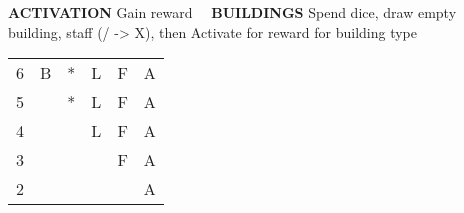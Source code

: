 \begin{flushleft}
\textbf{ACTIVATION} \textcolor{supplemental}{Gain reward} \ \ \textbf{BUILDINGS} \textcolor{supplemental}{Spend dice, draw empty building, staff (/ -> X), then Activate for reward}
\newline \textcolor{supplemental}{for building type}
\end{flushleft}
\begin{tabular}{|l|lllll}
\cline{1-1}
6 & \cellcolor{supplemental}B & *                         & L                         & F                         & A                         \\ \cline{1-1}
5 &                           & \cellcolor{supplemental}* & L                         & F                         & A                         \\ \cline{1-1}
4 &                           &                           & \cellcolor{supplemental}L & F                         & A                         \\ \cline{1-1}
3 &                           &                           &                           & \cellcolor{supplemental}F & A                         \\ \cline{1-1}
2 &                           &                           &                           &                           & \cellcolor{supplemental}A \\ \cline{1-1}
\end{tabular}
